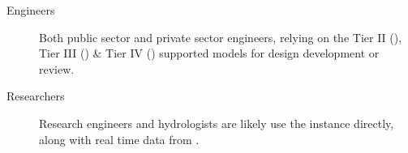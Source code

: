 \documentclass[letterpaper,12pt,english]{book}
\begin{document}
\begin{description}
\item[{Engineers}] \leavevmode
\sphinxAtStartPar
Both public sector and private sector engineers, relying on the {\hyperref[\detokenize{glossary:term-REON-WM}]{}} Tier II ({\hyperref[\detokenize{glossary:term-HEC-RAS}]{}}), Tier III ({\hyperref[\detokenize{glossary:term-HEC-HMS}]{}}) \& Tier IV ({\hyperref[\detokenize{glossary:term-SWMM}]{}}) supported models for design development or review.

\item[{Researchers}] \leavevmode
\sphinxAtStartPar
Research engineers and hydrologists are likely use the {\hyperref[\detokenize{glossary:term-REON-WM}]{}} {\hyperref[\detokenize{glossary:term-WRF-Hydro}]{}} instance directly, along with real time data from {\hyperref[\detokenize{glossary:term-RTHS.us}]{}}.

\end{description}
\end{document}
